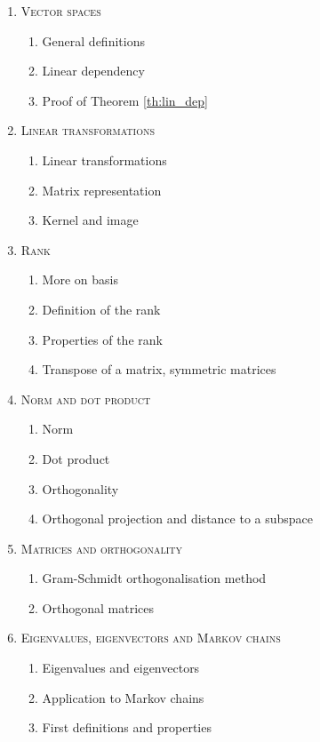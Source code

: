 \begin{enumerate}[label=\textbf{\arabic*.}]
\item \textsc{Vector spaces}
\begin{enumerate}[label=\arabic*.]
\item General definitions
\item Linear dependency
\item Proof of Theorem \ref{th:lin_dep}
\end{enumerate}
\item \textsc{Linear transformations}
\begin{enumerate}[label=\arabic*.]
\item Linear transformations
\item Matrix representation
\item Kernel and image
\end{enumerate}
\item \textsc{Rank}
\begin{enumerate}[label=\arabic*.]
\item More on basis
\item Definition of the rank
\item Properties of the rank
\item Transpose of a matrix, symmetric matrices
\end{enumerate}
\item \textsc{Norm and dot product}
\begin{enumerate}[label=\arabic*.]
\item Norm
\item Dot product
\item Orthogonality
\item Orthogonal projection and distance to a subspace
\end{enumerate}
\item \textsc{Matrices and orthogonality}
\begin{enumerate}[label=\arabic*.]
\item Gram-Schmidt orthogonalisation method
\item Orthogonal matrices
\end{enumerate}
\item \textsc{Eigenvalues, eigenvectors and Markov chains}
\begin{enumerate}[label=\arabic*.]
\item Eigenvalues and eigenvectors
\item Application to Markov chains
\item First definitions and properties

\end{enumerate}
\end{enumerate}
